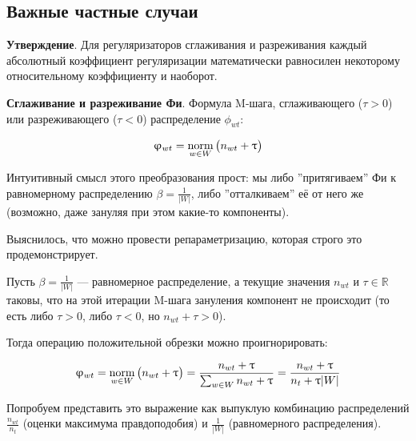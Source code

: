  

\subsection{Важные частные случаи} 


 

\textbf{Утверждение}. Для регуляризаторов сглаживания и разреживания каждый абсолютный коэффициент регуляризации математически равносилен некоторому относительному коэффициенту и наоборот. 

 

\textbf{Сглаживание и разреживание Фи}. Формула M-шага, сглаживающего ($\tau > 0$) или разреживающего ($\tau < 0$) распределение $\phi_{wt}$: 

 

\[ 

\phi_{wt} = \norm_{w \in W} \big( n_{wt} + \tau \big) 

\] 

 

Интуитивный смысл этого преобразования прост: мы либо ''притягиваем'' Фи к равномерному распределению $\beta = \frac{1}{|W|}$, либо ''отталкиваем'' её от него же (возможно, даже зануляя при этом какие-то компоненты). 

 

Выяснилось, что можно провести репараметризацию, которая строго это продемонстрирует.  

 

Пусть $\beta = \frac{1}{|W|}$ --- равномерное распределение, а текущие значения $n_{wt}$ и $\tau \in \mathbb{R}$ таковы, что на этой итерации M-шага зануления компонент не происходит (то есть либо $\tau > 0$, либо $\tau < 0$, но $n_{wt} + \tau > 0$). 

 

Тогда операцию положительной обрезки можно проигнорировать: 

 

\[ 

\phi_{wt} = \norm_{w \in W} \big( n_{wt} + \tau \big) = \frac{n_{wt} + \tau }{\sum_{w \in W} n_{wt} + \tau } = \frac{n_{wt} + \tau }{n_{t} + \tau |W|}   

\] 

 

Попробуем представить это выражение как выпуклую комбинацию распределений  $\frac{n_{wt}}{n_t}$ (оценки максимума правдоподобия) и $\frac{1}{|W|}$ (равномерного распределения).  

